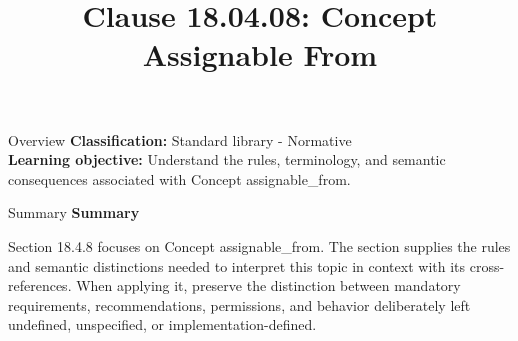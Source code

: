 \documentclass[10pt,letterpaper]{article}
\title{Clause 18.04.08: Concept Assignable From}
\author{}
\date{}
\begin{document}
\maketitle
\begin{CornellOverviewBox}{Overview}
\textbf{Classification:} Standard library - Normative\\[2pt]
\textbf{Learning objective:} Understand the rules, terminology, and semantic consequences associated with Concept assignable\_from.
\end{CornellOverviewBox}\begin{CornellSummaryBox}{Summary}
{\sffamily\bfseries\color{Accent} Summary}\par\vspace{3pt}Section 18.4.8 focuses on Concept assignable\_from. The section supplies the rules and semantic distinctions needed to interpret this topic in context with its cross-references. When applying it, preserve the distinction between mandatory requirements, recommendations, permissions, and behavior deliberately left undefined, unspecified, or implementation-defined.
\end{CornellSummaryBox}
\end{document}
